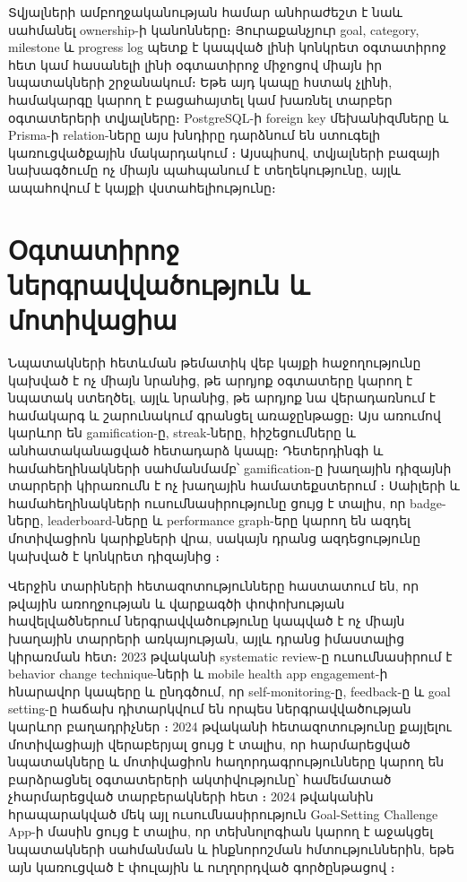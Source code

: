 Տվյալների ամբողջականության համար անհրաժեշտ է նաև սահմանել ownership-ի կանոնները։ Յուրաքանչյուր goal, category, milestone և progress log պետք է կապված լինի կոնկրետ օգտատիրոջ հետ կամ հասանելի լինի օգտատիրոջ միջոցով միայն իր նպատակների շրջանակում։ Եթե այդ կապը հստակ չլինի, համակարգը կարող է բացահայտել կամ խառնել տարբեր օգտատերերի տվյալները։ PostgreSQL-ի foreign key մեխանիզմները և Prisma-ի relation-ները այս խնդիրը դարձնում են ստուգելի կառուցվածքային մակարդակում \autocite{postgresDocsConstraints,prismaDocsRelations}։ Այսպիսով, տվյալների բազայի նախագծումը ոչ միայն պահպանում է տեղեկությունը, այլև ապահովում է կայքի վստահելիությունը։

\section{Օգտատիրոջ ներգրավվածություն և մոտիվացիա}

Նպատակների հետևման թեմատիկ վեբ կայքի հաջողությունը կախված է ոչ միայն նրանից, թե արդյոք օգտատերը կարող է նպատակ ստեղծել, այլև նրանից, թե արդյոք նա վերադառնում է համակարգ և շարունակում գրանցել առաջընթացը։ Այս առումով կարևոր են gamification-ը, streak-ները, հիշեցումները և անհատականացված հետադարձ կապը։ Դետերդինգի և համահեղինակների սահմանմամբ՝ gamification-ը խաղային դիզայնի տարրերի կիրառումն է ոչ խաղային համատեքստերում \autocite{deterding2011gamification}։ Սաիլերի և համահեղինակների ուսումնասիրությունը ցույց է տալիս, որ badge-ները, leaderboard-ները և performance graph-երը կարող են ազդել մոտիվացիոն կարիքների վրա, սակայն դրանց ազդեցությունը կախված է կոնկրետ դիզայնից \autocite{sailer2017gamification}։

Վերջին տարիների հետազոտությունները հաստատում են, որ թվային առողջության և վարքագծի փոփոխության հավելվածներում ներգրավվածությունը կապված է ոչ միայն խաղային տարրերի առկայության, այլև դրանց իմաստալից կիրառման հետ։ 2023 թվականի systematic review-ը ուսումնասիրում է behavior change technique-ների և mobile health app engagement-ի հնարավոր կապերը և ընդգծում, որ self-monitoring-ը, feedback-ը և goal setting-ը հաճախ դիտարկվում են որպես ներգրավվածության կարևոր բաղադրիչներ \autocite{bctEngagement2023}։ 2024 թվականի հետազոտությունը քայլելու մոտիվացիայի վերաբերյալ ցույց է տալիս, որ հարմարեցված նպատակները և մոտիվացիոն հաղորդագրությունները կարող են բարձրացնել օգտատերերի ակտիվությունը՝ համեմատած չհարմարեցված տարբերակների հետ \autocite{walkingGoals2024}։ 2024 թվականին հրապարակված մեկ այլ ուսումնասիրություն Goal-Setting Challenge App-ի մասին ցույց է տալիս, որ տեխնոլոգիան կարող է աջակցել նպատակների սահմանման և ինքնորոշման հմտություններին, եթե այն կառուցված է փուլային և ուղղորդված գործընթացով \autocite{mazzotti2024goalsetting}։

